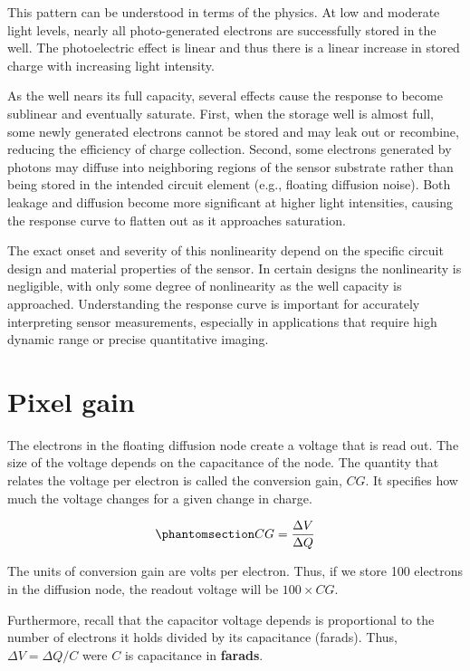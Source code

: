 \documentclass[
  letterpaper,
]{book}
\begin{document}
This pattern can be understood in terms of the physics. At low and
moderate light levels, nearly all photo-generated electrons are
successfully stored in the well. The photoelectric effect is linear and
thus there is a linear increase in stored charge with increasing light
intensity.

As the well nears its full capacity, several effects cause the response
to become sublinear and eventually saturate. First, when the storage
well is almost full, some newly generated electrons cannot be stored and
may leak out or recombine, reducing the efficiency of charge collection.
Second, some electrons generated by photons may diffuse into neighboring
regions of the sensor substrate rather than being stored in the intended
circuit element (e.g., floating diffusion noise). Both leakage and
diffusion become more significant at higher light intensities, causing
the response curve to flatten out as it approaches saturation.

The exact onset and severity of this nonlinearity depend on the specific
circuit design and material properties of the sensor. In certain designs
the nonlinearity is negligible, with only some degree of nonlinearity as
the well capacity is approached. Understanding the response curve is
important for accurately interpreting sensor measurements, especially in
applications that require high dynamic range or precise quantitative
imaging.

\section{Pixel gain}\label{sec-pixel-gain}

The electrons in the floating diffusion node create a voltage that is
read out. The size of the voltage depends on the capacitance of the
node. The quantity that relates the voltage per electron is called the
conversion gain, \(CG\). It specifies how much the voltage changes for a
given change in charge.

\begin{equation}\phantomsection\label{eq-conversion-gain}{
CG = \frac{\Delta V}{\Delta Q}
}\end{equation}

The units of conversion gain are volts per electron. Thus, if we store
100 electrons in the diffusion node, the readout voltage will be
\(100 \times CG\).

Furthermore, recall that the capacitor voltage depends is proportional
to the number of electrons it holds divided by its capacitance (farads).
Thus, \(\Delta V = \Delta Q / C\) were \(C\) is capacitance in
\textbf{farads}.
\end{document}
